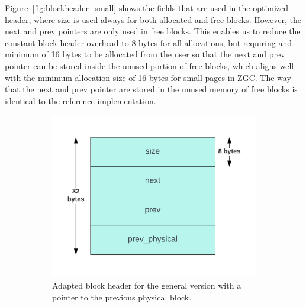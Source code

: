 
Figure~\ref{fig:blockheader_small} shows the fields that are used in the optimized header, where size is used always for both allocated and free blocks. However, the next and prev pointers are only used in free blocks. This enables us to reduce the constant block header overhead to 8 bytes for all allocations, but requiring and minimum of 16 bytes to be allocated from the user so that the next and prev pointer can be stored inside the unused portion of free blocks, which aligns well with the minimum allocation size of 16 bytes for small pages in ZGC. The way that the next and prev pointer are stored in the unused memory of free blocks is identical to the reference implementation.

\begin{figure}[H]
    \centering
    \begin{subfigure}[b]{0.49\textwidth}
        \centering
        \includegraphics[width=\textwidth]{figures/blockheader_large.png}
        \caption{Adapted block header for the general version with a pointer to the previous physical block.}
        \label{fig:blockheader_large}
    \end{subfigure}
    \hfill
    \begin{subfigure}[b]{0.49\textwidth}
        \centering

\end{subfigure}
\end{figure}
